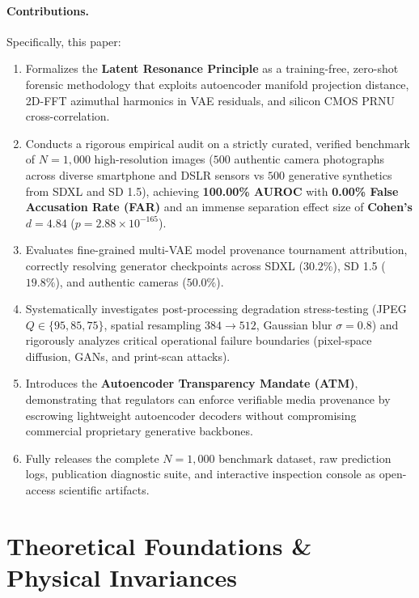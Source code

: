 \documentclass[11pt]{article}
\theoremstyle{definition}
\begin{document}
\paragraph{Contributions.} Specifically, this paper:
\begin{enumerate}
    \item Formalizes the \textbf{Latent Resonance Principle} as a training-free, zero-shot forensic methodology that exploits autoencoder manifold projection distance, 2D-FFT azimuthal harmonics in VAE residuals, and silicon CMOS PRNU cross-correlation.
    \item Conducts a rigorous empirical audit on a strictly curated, verified benchmark of $N=1,000$ high-resolution images ($500$ authentic camera photographs across diverse smartphone and DSLR sensors vs $500$ generative synthetics from SDXL and SD 1.5), achieving \textbf{100.00\% AUROC} with \textbf{0.00\% False Accusation Rate (FAR)} and an immense separation effect size of \textbf{Cohen's $d = 4.84$} ($p = 2.88 \times 10^{-165}$).
    \item Evaluates fine-grained multi-VAE model provenance tournament attribution, correctly resolving generator checkpoints across SDXL ($30.2\%$), SD 1.5 ($19.8\%$), and authentic cameras ($50.0\%$).
    \item Systematically investigates post-processing degradation stress-testing (JPEG $Q \in \{95, 85, 75\}$, spatial resampling $384 \to 512$, Gaussian blur $\sigma = 0.8$) and rigorously analyzes critical operational failure boundaries (pixel-space diffusion, GANs, and print-scan attacks).
    \item Introduces the \textbf{Autoencoder Transparency Mandate (ATM)}, demonstrating that regulators can enforce verifiable media provenance by escrowing lightweight autoencoder decoders without compromising commercial proprietary generative backbones.
    \item Fully releases the complete $N=1,000$ benchmark dataset, raw prediction logs, publication diagnostic suite, and interactive inspection console as open-access scientific artifacts.
\end{enumerate}

\section{Theoretical Foundations \& Physical Invariances}
\label{sec:theory}
\end{document}
